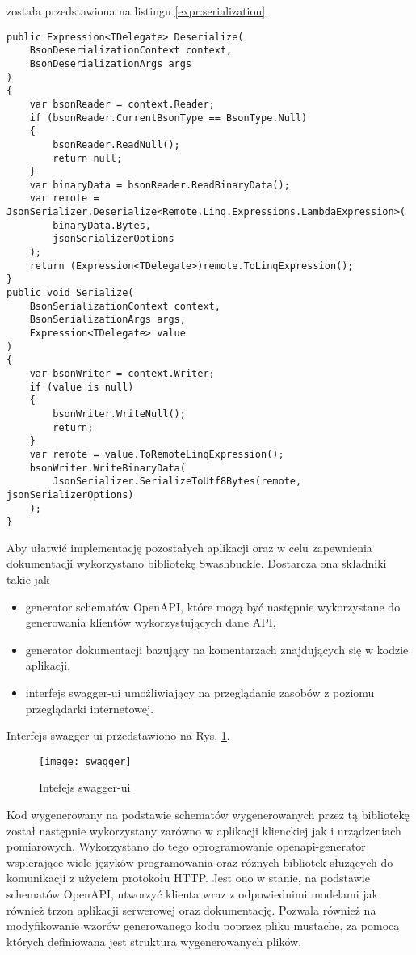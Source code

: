została przedstawiona na listingu \ref{expr:serialization}.
\begin{lstlisting}[language={[Sharp]C},caption={Serializacja ekspresji},label={expr:serialization},captionpos=b]
public Expression<TDelegate> Deserialize(
    BsonDeserializationContext context,
    BsonDeserializationArgs args
)
{
    var bsonReader = context.Reader;
    if (bsonReader.CurrentBsonType == BsonType.Null)
    {
        bsonReader.ReadNull();
        return null;
    }
    var binaryData = bsonReader.ReadBinaryData();
    var remote = JsonSerializer.Deserialize<Remote.Linq.Expressions.LambdaExpression>(
        binaryData.Bytes,
        jsonSerializerOptions
    );
    return (Expression<TDelegate>)remote.ToLinqExpression();
}
public void Serialize(
    BsonSerializationContext context,
    BsonSerializationArgs args,
    Expression<TDelegate> value
)
{
    var bsonWriter = context.Writer;
    if (value is null)
    {
        bsonWriter.WriteNull();
        return;
    }
    var remote = value.ToRemoteLinqExpression();
    bsonWriter.WriteBinaryData(
        JsonSerializer.SerializeToUtf8Bytes(remote, jsonSerializerOptions)
    );
}
\end{lstlisting}

Aby ułatwić implementację pozostałych aplikacji oraz w celu zapewnienia dokumentacji
wykorzystano bibliotekę Swashbuckle. Dostarcza ona składniki takie jak 
\begin{itemize}
  \item generator schematów OpenAPI, które mogą być następnie wykorzystane do generowania klientów
wykorzystujących dane API,
  \item generator dokumentacji bazujący na komentarzach znajdujących się w kodzie aplikacji,
  \item interfejs swagger-ui umożliwiający na przeglądanie zasobów z poziomu przeglądarki internetowej.
\end{itemize}
Interfejs swagger-ui przedstawiono na Rys. \ref{swagger:interface}.
\begin{figure}[h!]
  \centering
  \texttt{[image: swagger]}
  \caption{Intefejs swagger-ui}
  \label{swagger:interface}
\end{figure}
Kod wygenerowany na podstawie schematów wygenerowanych przez tą bibliotekę został następnie
wykorzystany zarówno w aplikacji klienckiej jak i urządzeniach pomiarowych.
Wykorzystano do tego oprogramowanie openapi-generator wspierające wiele języków
programowania oraz różnych bibliotek służących do komunikacji z użyciem protokołu HTTP.
Jest ono w stanie, na podstawie schematów OpenAPI, utworzyć klienta wraz z odpowiednimi
modelami jak również trzon aplikacji serwerowej oraz dokumentację. Pozwala również
na modyfikowanie wzorów generowanego kodu poprzez pliku mustache, za pomocą których
definiowana jest struktura wygenerowanych plików.

